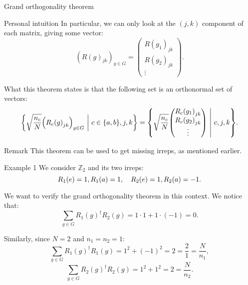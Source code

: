 \documentclass[a4paper]{article}
\begin{document}
\begin{parag}{Grand orthogonality theorem}
\begin{subparag}{Personal intuition}
        In particular, we can only look at the $\left(j, k\right)$ component of each matrix, giving some vector: 
        \[\left(R\left(g\right)_{jk}\right)_{g \in G} = \begin{pmatrix} R\left(g_1\right)_{jk} \\ R\left(g_2\right)_{jk} \\ \vdots \end{pmatrix}.\]

        What this theorem states is that the following set is an orthonormal set of vectors: 
        \[\left\{\sqrt{\frac{n_c}{N}} \left(R_c\left(g\right)_{jk}\right)_{g \in G} \suchthat c \in \left\{a, b\right\}, j, k\right\} = \left\{\sqrt{\frac{n_c}{N}} \begin{pmatrix} R_c\left(g_1\right)_{jk} \\ R_c\left(g_2\right)_{jk} \\ \vdots \end{pmatrix} \suchthat c , j, k\right\}.\]
    \end{subparag}

    \begin{subparag}{Remark}
        This theorem can be used to get missing irreps, as mentioned earlier.
    \end{subparag}
\end{parag}

\begin{parag}{Example 1}
    We consider $\mathbb{Z}_2$ and its two irreps: 
    \[R_1\left(e\right) = 1, R_1\left(a\right) = 1, \mathspace R_2\left(e\right) = 1, R_2\left(a\right) = -1.\]

    We want to verify the grand orthogonality theorem in this context. We notice that: 
    \[\sum_{g \in G} R_1\left(g\right)^{\dagger} R_2\left(g\right) = 1\cdot 1 + 1\cdot \left(-1\right) = 0.\]

    Similarly, since $N = 2$ and $n_1 = n_2 = 1$: 
    \[\sum_{g \in G} R_1\left(g\right)^{\dagger} R_1\left(g\right) = 1^2 + \left(-1\right)^2 = 2 = \frac{2}{1} = \frac{N}{n_1},\] 
    \[\sum_{g \in G} R_2\left(g\right)^{\dagger} R_2\left(g\right) = 1^2 + 1^2 = 2 = \frac{N}{n_2}.\]
\end{parag}
\end{document}
